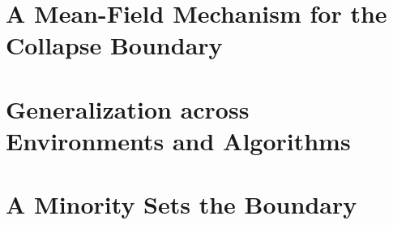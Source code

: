 \documentclass[letterpaper]{article}
\theoremstyle{plain}
\begin{document}
\section{A Mean-Field Mechanism for the Collapse Boundary}
\label{sec:meanfield}

\section{Generalization across Environments and Algorithms}
\label{sec:generalization}

\section{A Minority Sets the Boundary}
\label{sec:heterogeneous}

\end{document}
